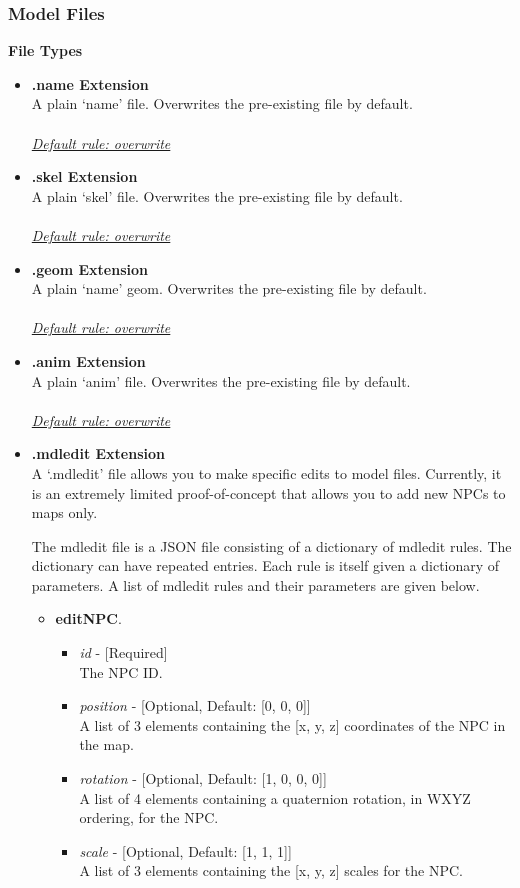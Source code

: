 \documentclass{article}
\begin{document}
\subsubsection{Model Files}
\textbf{File Types}
\begin{itemize}
\item \textbf{.name Extension}\\
A plain `name' file. Overwrites the pre-existing file by default.\\\\
\underline{\textit{Default rule: overwrite}}
\item \textbf{.skel Extension}\\
A plain `skel' file. Overwrites the pre-existing file by default.\\\\
\underline{\textit{Default rule: overwrite}}
\item \textbf{.geom Extension}\\
A plain `name' geom. Overwrites the pre-existing file by default.\\\\
\underline{\textit{Default rule: overwrite}}
\item \textbf{.anim Extension}\\
A plain `anim' file. Overwrites the pre-existing file by default.\\\\
\underline{\textit{Default rule: overwrite}}
\item \textbf{.mdledit Extension}\\
A `.mdledit' file allows you to make specific edits to model files. Currently, it is an extremely limited proof-of-concept that allows you to add new NPCs to maps only.

The mdledit file is a JSON file consisting of a dictionary of mdledit rules. The dictionary can have repeated entries. Each rule is itself given a dictionary of parameters. A list of mdledit rules and their parameters are given below.
\begin{itemize}
\item \textbf{editNPC}.
\begin{itemize}
\item \textit{id} - [Required]\\The NPC ID.
\item \textit{position} - [Optional, Default: [0, 0, 0]]\\A list of 3 elements containing the [x, y, z] coordinates of the NPC in the map.
\item \textit{rotation} - [Optional, Default: [1, 0, 0, 0]] \\A list of 4 elements containing a quaternion rotation, in WXYZ ordering, for the NPC.
\item \textit{scale} - [Optional, Default: [1, 1, 1]] \\A list of 3 elements containing the [x, y, z] scales for the NPC.
\end{itemize}
\end{itemize}
\end{itemize}
\end{document}
